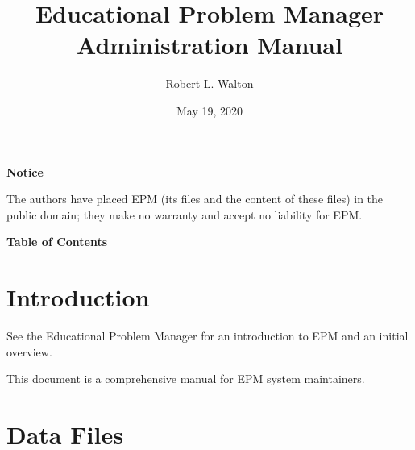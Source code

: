 \documentclass[12pt]{article}
\makeatletter
\renewcommand\tableofcontents{%
    \begin{list}{}%
	     {\setlength{\itemsep}{0in}%
	      \setlength{\topsep}{0in}%
	      \setlength{\parsep}{1ex}%
	      \setlength{\labelwidth}{0in}%
	      \setlength{\baselineskip}{1.5ex}%
	      \setlength{\leftmargin}{0.8in}%
	      \setlength{\rightmargin}{0.8in}}%
    \item\@starttoc{toc}%
    \end{list}}
\makeatother
\begin{document}
        
\title{Educational Problem Manager\\
Administration Manual}

\author{Robert L. Walton}

\date{May 19, 2020}
 
\maketitle

\begin{center}
{\large \bf Notice}
\\[2ex]
\begin{minipage}{5.5in}
The authors have placed EPM (its files and the content of these files) in
the public domain; they make no warranty and accept
no liability for EPM.
\end{minipage}
\end{center}
\begin{center}
\large \bf Table of Contents
\end{center}

\bigskip

\tableofcontents 

\newpage

\section{Introduction}

See the Educational Problem Manager for an introduction to EPM
and an initial overview.

This document is a comprehensive manual for EPM system maintainers.

\section{Data Files}
\end{document}
